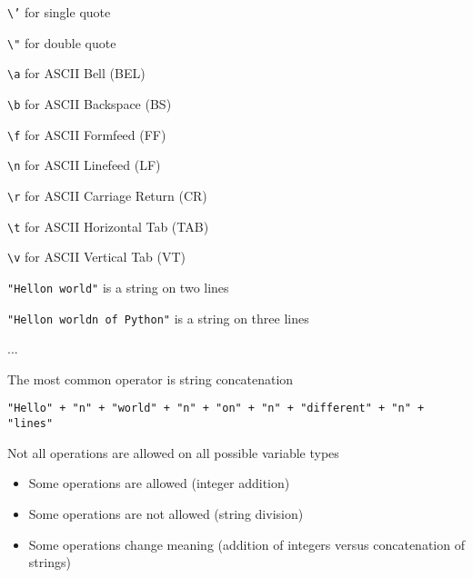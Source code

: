 \documentclass{beamer}
\begin{document}
\begin{slide}{
\small
\item \texttt{\textbackslash '} for single quote
\item \texttt{\textbackslash "} for double quote
\item \texttt{\textbackslash a} for ASCII Bell (BEL)  
\item \texttt{\textbackslash b} for ASCII Backspace (BS)  
\item \texttt{\textbackslash f} for ASCII Formfeed (FF)  
\item \texttt{\textbackslash n} for ASCII Linefeed (LF)  
\item \texttt{\textbackslash r} for ASCII Carriage Return (CR)  
\item \texttt{\textbackslash t} for ASCII Horizontal Tab (TAB)  
\item \texttt{\textbackslash v} for ASCII Vertical Tab (VT) 
}\end{slide}

\begin{slide}{
\item \texttt{"Hello\ts n world"} is a string on two lines
\item \texttt{"Hello\ts n world\ts n of Python"} is a string on three lines
\item ...
}\end{slide}

\begin{slide}{
\item The most common operator is string concatenation
\item \texttt{"Hello" + "\ts n" + "world" + "\ts n" + "on" + "\ts n" + "different" + "\ts n" + "lines"}
}\end{slide}


\begin{slide}{
\item Not all operations are allowed on all possible variable types
\begin{itemize}
\item Some operations are allowed (integer addition)
\item Some operations are not allowed (string division)
\item Some operations change meaning (addition of integers versus concatenation of strings)
\end{itemize}
}\end{slide}
\end{document}
